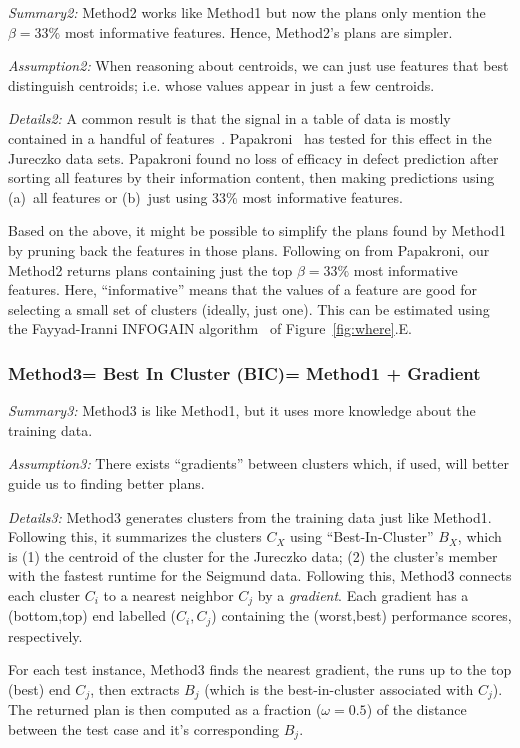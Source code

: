 \documentclass{sig-alternate}
\newcommand{\fig}[1]{Figure~\ref{fig:#1}}
\begin{document}
{\em Summary2:} Method2 works like Method1 but now the   plans  only
mention the $\beta=33\%$ most informative features. Hence, Method2's plans are simpler.

{\em Assumption2: }  When reasoning about centroids, we can
just use features that best distinguish centroids; i.e. whose values appear in just a few centroids.
 

{\em Details2:} A common result is that the signal in a table of data is mostly contained in a handful of features~\cite{hall03,kohavi97}.
Papakroni~\cite{papa13} has tested for this effect in the Jureczko data sets.
Papakroni found no loss of   efficacy in defect prediction after
sorting all features by their information content,
then making predictions using (a)~all  features or (b)~just using   33\% most informative features.

Based on the above, it might be possible to simplify the plans found by Method1  by pruning back the features in those
 plans. Following on from Papakroni, our Method2 returns plans
containing just the top $\beta=33\%$ most informative features. Here, ``informative'' means
that the values of a feature are good for selecting a small set of clusters (ideally,
just one).
This can be estimated using the Fayyad-Iranni INFOGAIN algorithm~\cite{FayIra93Multi}
of \fig{where}.E.
 
 
 
\subsubsection{Method3= Best In Cluster (BIC)=   Method1 + Gradient}\label{sect:BIC}

{\em Summary3:} Method3 is like Method1, but it uses more knowledge about the training data.

{\em Assumption3: } There exists ``gradients'' between clusters which, if used, will better guide us to finding better plans.

{\em Details3:}
Method3 generates clusters from the training data just like Method1. Following this, it summarizes the clusters $C_X$ using ``Best-In-Cluster'' $B_X$, which is (1) the centroid of the cluster for the Jureczko data; (2) the cluster's member with the fastest runtime for the Seigmund data. Following this, Method3 connects  each cluster $C_i$ to a nearest neighbor $C_j$ by a {\em gradient}. Each gradient has a (bottom,top) end labelled  ($C_i,C_j$) containing the (worst,best) performance scores, respectively. 

For each test instance, Method3 finds the nearest gradient, the runs up to the top (best) end $C_j$, then extracts $B_j$ (which is the best-in-cluster associated with  $C_j$). The returned plan is then computed as a fraction ($\omega=0.5$) of the distance between the test case and it's corresponding $B_j$.
 
\end{document}

